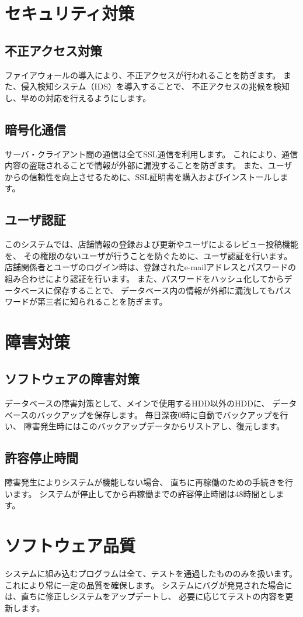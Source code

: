 \documentclass[a4j,titlepage]{jarticle}
\begin{document}
\section{セキュリティ対策}
\subsection{不正アクセス対策}
ファイアウォールの導入により、不正アクセスが行われることを防ぎます。
また、侵入検知システム（IDS）を導入することで、
不正アクセスの兆候を検知し、早めの対応を行えるようにします。
\subsection{暗号化通信}
サーバ・クライアント間の通信は全てSSL通信を利用します。
これにより、通信内容の盗聴されることで情報が外部に漏洩することを防ぎます。
また、ユーザからの信頼性を向上させるために、SSL証明書を購入およびインストールします。
\subsection{ユーザ認証}
このシステムでは、店舗情報の登録および更新やユーザによるレビュー投稿機能を、
その権限のないユーザが行うことを防ぐために、ユーザ認証を行います。
店舗関係者とユーザのログイン時は、登録されたe-mailアドレスとパスワードの組み合わせにより認証を行います。
また、パスワードをハッシュ化してからデータベースに保存することで、
データベース内の情報が外部に漏洩してもパスワードが第三者に知られることを防ぎます。

\section{障害対策}
\subsection{ソフトウェアの障害対策}
データベースの障害対策として、メインで使用するHDD以外のHDDに、
データベースのバックアップを保存します。
毎日深夜0時に自動でバックアップを行い、
障害発生時にはこのバックアップデータからリストアし、復元します。
\subsection{許容停止時間}
障害発生によりシステムが機能しない場合、
直ちに再稼働のための手続きを行います。
システムが停止してから再稼働までの許容停止時間は48時間とします。

\section{ソフトウェア品質}
システムに組み込むプログラムは全て、テストを通過したもののみを扱います。
これにより常に一定の品質を確保します。
システムにバグが発見された場合には、直ちに修正しシステムをアップデートし、
必要に応じてテストの内容を更新します。
\end{document}
